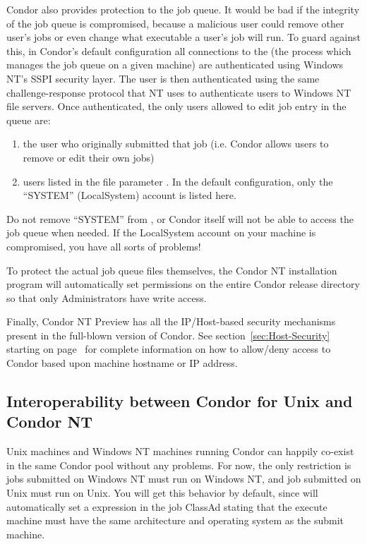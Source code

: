 Condor also provides protection to the job queue.  It would be bad if the
integrity of the job queue is compromised, because a malicious user could
remove other user's jobs or even change what executable a user's job will
run.  To guard against this, in Condor's default configuration all connections to the  (the
process which manages the job queue on a given machine) are authenticated
using Windows NT's SSPI security layer.  The user is then authenticated
using the same challenge-response protocol that NT uses to authenticate
users to Windows NT file servers.  Once authenticated, the only users
allowed to edit job entry in the queue are:
\begin{enumerate}
\item the user who originally submitted that job (i.e. Condor allows users
to remove or edit their own jobs)
\item users listed in the  file parameter
.  In the default configuration, only the
``SYSTEM'' (LocalSystem) account is listed here.  
\end{enumerate}
\Warn Do not remove ``SYSTEM'' from , or
Condor itself will not be able to access the job queue when needed.  If the
LocalSystem account on your machine is compromised, you have all sorts of
problems!

To protect the actual job queue files themselves, the Condor NT installation
program will automatically set permissions on the entire Condor release
directory so that only Administrators have write access.

Finally, Condor NT Preview has all the IP/Host-based security mechanisms present in the full-blown version of Condor.  See section~\ref{sec:Host-Security} starting on page~\pageref{sec:Host-Security} for complete information on how to allow/deny access to Condor based upon machine hostname or IP address.

\subsection{Interoperability between Condor for Unix and Condor NT}

Unix machines and Windows NT machines running Condor can happily co-exist in
the same Condor pool without any problems.  For now, the only restriction is jobs
submitted on Windows NT must run on Windows NT, and job submitted on Unix
must run on Unix.  You will get this behavior by default, since
 will automatically set a  expression in
the job ClassAd stating that the execute machine must have the same
architecture and operating system as the submit machine. 

